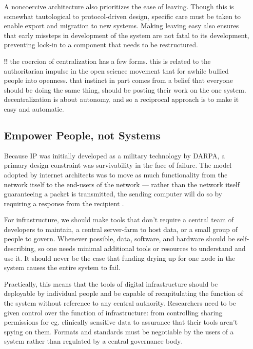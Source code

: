 \documentclass[10pt]{tufte-book}
\begin{document}
A noncoercive architecture also prioritizes the ease of leaving. Though
this is somewhat tautological to protocol-driven design, specific care
must be taken to enable export and migration to new systems. Making
leaving easy also ensures that early missteps in development of the
system are not fatal to its development, preventing lock-in to a
component that needs to be restructured.

!! the coercion of centralization has a few forms. this is related to
the authoritarian impulse in the open science movement that for awhile
bullied people into openness. that instinct in part comes from a belief
that everyone should be doing the same thing, should be posting their
work on the one system. decentralization is about autonomy, and so a
reciprocal approach is to make it easy and automatic.


\subsection{Empower People, not
Systems}

Because IP was initially developed as a military technology by DARPA, a
primary design constraint was survivability in the face of failure. The
model adopted by internet architects was to move as much functionality
from the network itself to the end-users of the network --- rather than
the network itself guaranteeing a packet is transmitted, the sending
computer will do so by requiring a response from the recipient \citep{clarkDesignPhilosophyDARPA1988} .

For infrastructure, we should make tools that don't require a central
team of developers to maintain, a central server-farm to host data, or a
small group of people to govern. Whenever possible, data, software, and
hardware should be self-describing, so one needs minimal additional
tools or resources to understand and use it. It should never be the case
that funding drying up for one node in the system causes the entire
system to fail.

Practically, this means that the tools of digital infrastructure should
be deployable by individual people and be capable of recapitulating the
function of the system without reference to any central authority.
Researchers need to be given control over the function of
infrastructure: from controlling sharing permissions for eg. clinically
sensitive data to assurance that their tools aren't spying on them.
Formats and standards must be negotiable by the users of a system rather
than regulated by a central governance body.
\end{document}
